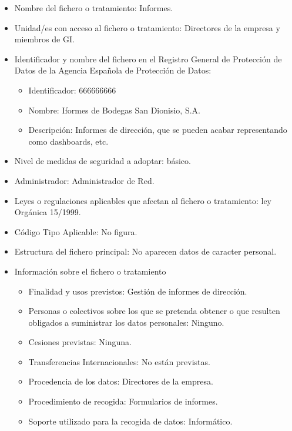 \documentclass[a4paper,11pt,bibtotoc,noliststotoc]{scrbook}
\newcommand{\laorganizacion}{Bodegas San Dionisio, S.A.}
\begin{document}
\begin{itemize}
\item Nombre del fichero o tratamiento: Informes.

\item Unidad/es con acceso al fichero o tratamiento: Directores de la empresa y miembros de GI.

\item Identificador y nombre del fichero en el Registro General de Protección de Datos de la Agencia Española de Protección de Datos:
	\begin{itemize}
	\item Identificador: 666666666
	\item Nombre: Iformes de \laorganizacion
	\item Descripción: Informes de dirección, que se pueden acabar representando como dashboards, etc.
	\end{itemize}

\item Nivel de medidas de seguridad a adoptar: básico.

\item Administrador: Administrador de Red.

\item Leyes o regulaciones aplicables que afectan al fichero o tratamiento: ley Orgánica 15/1999.

\item Código Tipo Aplicable: No figura.

\item Estructura del fichero principal: No aparecen datos de caracter personal.

\item Información sobre el fichero o tratamiento
	\begin{itemize}
	\item Finalidad y usos previstos: Gestión de informes de dirección.
	\item Personas o colectivos sobre los que se pretenda obtener o que resulten obligados a suministrar los datos personales: Ninguno.
	\item Cesiones previstas: Ninguna.
	\item Transferencias Internacionales: No están previstas.
	\item Procedencia de los datos: Directores de la empresa.
	\item Procedimiento de recogida: Formularios de informes.
	\item Soporte utilizado para la recogida de datos: Informático.
	\end{itemize}


\end{itemize}
\end{document}
